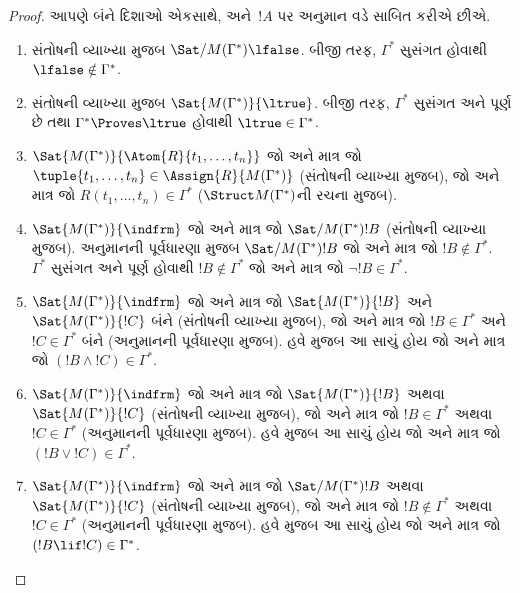 \begin{proof}
આપણે બંને દિશાઓ એકસાથે, અને~$!A$ પર અનુમાન વડે સાબિત કરીએ છીએ.
\begin{enumerate}
\item {}
  {સંતોષની વ્યાખ્યા મુજબ
    $\Sat/{M(\Gamma^*)}{\lfalse}$.
    બીજી તરફ, $\Gamma^*$ સુસંગત હોવાથી $\lfalse\notin\Gamma^*$.}

\item {}
  {સંતોષની વ્યાખ્યા મુજબ
    $\Sat{M(\Gamma^*)}{\ltrue}$.
    બીજી તરફ, $\Gamma^*$ સુસંગત અને પૂર્ણ છે તથા
    $\Gamma^*\Proves\ltrue$ હોવાથી $\ltrue\in\Gamma^*$.}

\item {}
  {$\Sat{M(\Gamma^*)}{\Atom{R}{t_1,\dots,t_n}}$ જો અને માત્ર જો
    $\tuple{t_1,\dots,t_n}\in\Assign{R}{M(\Gamma^*)}$ (સંતોષની
    વ્યાખ્યા મુજબ), જો અને માત્ર જો $R(t_1,\dots,t_n)\in\Gamma^*$
    ($\Struct M(\Gamma^*)$ની રચના મુજબ).}

\item %
    {$\Sat{M(\Gamma^*)}{\indfrm}$ જો
    અને માત્ર જો
    $\Sat/{M(\Gamma^*)}{!B}$
    (સંતોષની વ્યાખ્યા મુજબ). અનુમાનની પૂર્વધારણા મુજબ
    $\Sat/{M(\Gamma^*)}{!B}$
    જો અને માત્ર જો $!B\notin\Gamma^*$. ~ $\Gamma^*$ સુસંગત અને
    પૂર્ણ હોવાથી $!B\notin\Gamma^*$ જો અને માત્ર જો
    $\lnot !B\in\Gamma^*$.}

\item %
%
    {$\Sat{M(\Gamma^*)}{\indfrm}$ જો
    અને માત્ર જો
    $\Sat{M(\Gamma^*)}{!B}$ અને
    $\Sat{M(\Gamma^*)}{!C}$ બંને
    (સંતોષની વ્યાખ્યા મુજબ), જો અને માત્ર જો $!B\in\Gamma^*$ અને
    $!C\in\Gamma^*$ બંને (અનુમાનની પૂર્વધારણા મુજબ). હવે
     મુજબ આ સાચું હોય જો
    અને માત્ર જો $(!B\land !C)\in\Gamma^*$.}

\item %
%
    {$\Sat{M(\Gamma^*)}{\indfrm}$ જો
    અને માત્ર જો
    $\Sat{M(\Gamma^*)}{!B}$ અથવા
    $\Sat{M(\Gamma^*)}{!C}$
    (સંતોષની વ્યાખ્યા મુજબ), જો અને માત્ર જો $!B\in\Gamma^*$ અથવા
    $!C\in\Gamma^*$ (અનુમાનની પૂર્વધારણા મુજબ). હવે
     મુજબ આ સાચું હોય જો
    અને માત્ર જો $(!B\lor !C)\in\Gamma^*$.}

\item %
%
    {$\Sat{M(\Gamma^*)}{\indfrm}$ જો
    અને માત્ર જો
    $\Sat/{M(\Gamma^*)}{!B}$ અથવા
    $\Sat{M (\Gamma^*)}{!C}$
    (સંતોષની વ્યાખ્યા મુજબ), જો અને માત્ર જો $!B\notin\Gamma^*$ અથવા
    $!C\in\Gamma^*$ (અનુમાનની પૂર્વધારણા મુજબ). હવે
     મુજબ આ સાચું હોય જો
    અને માત્ર જો $(!B\lif !C)\in\Gamma^*$.}


\end{enumerate}
\end{proof}
